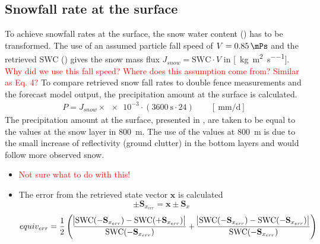 \subsection{Snowfall rate at the surface}
%
To achieve snowfall rates at the surface, the snow water content () has to be transformed. The use of an assumed particle fall speed of $V = \SI{0.85}{\mPs}$ and the retrieved SWC () gives the snow mass flux $J_{snow} = \text{SWC} \cdot V$ in [\SI{}{\kilogram\per\square\metre\per\second}]. \textcolor{red}{Why did we use this fall speed? Where does this assumption come from? Similar as \cite{cooper_variational_2017} Eq. 4?} 
To compare retrieved snow fall rates to double fence measurements and the forecast model output, the precipitation amount at the surface is calculated. 
\begin{align}
	P = J_{snow} \times \num{e-3} \cdot \left(\SI{3600}{\second} \cdot24 \right) \qquad [\SI{}{\mm\per\day}]
\end{align}
The precipitation amount at the surface, presented in , are taken to be equal to the values at the snow layer in \SI{800}{\metre}. The use of the values at \SI{800}{\metre} is due to the small increase of reflectivity (ground clutter) in the bottom layers and would follow more observed snow. 
%
\begin{itemize}
	\item \textcolor{red}{Not sure what to do with this!}
	\item The error from the retrieved state vector $\mathbf{x}$ is calculated
	$$\pm \mathbf{S}_{x_{err}} = \mathbf{x} \pm \mathbf{S}_x$$ 
	$$equiv_{err} = \frac{1}{2} \left( \frac{\abs{\text{SWC}(- \mathbf{S}_{x_{err}} ) - \text{SWC} (+ \mathbf{S}_{x_{err}}) }}{ \text{SWC}(- \mathbf{S}_{x_{err}})} + \frac{\abs{ \text{SWC}(- \mathbf{S}_{x_{err}}) - \text{SWC}(- \mathbf{S}_{x_{err}}) }}{ \text{SWC}(- \mathbf{S}_{x_{err}})} \right)$$
\end{itemize}






